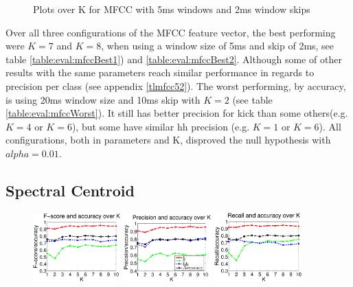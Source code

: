 {\begin{figure}
			\caption{Plots over K for MFCC with 5ms windows and 2ms window skips}
		\end{figure}\clearpage
		
		Over all three configurations of the MFCC feature vector, the best performing were $K=7$ and $K=8$, when using a window size of 5ms and skip of 2ms, see table \ref{table:eval:mfccBest1}) and \ref{table:eval:mfccBest2}. Although some of other results with the same parameters reach similar performance in regards to precision per class (see appendix \ref{tlmfcc52}). The worst performing, by accuracy, is using 20ms window size and 10ms skip with $K=2$ (see table \ref{table:eval:mfccWorst}). It still has better precision for kick than some others(e.g. $K=4$ or $K=6$), but some have similar hh precision (e.g. $K=1$ or $K=6$). All configurations, both in parameters and K, disproved the null hypothesis with $alpha=0.01$.
		
		
	\subsection{Spectral Centroid}
		\begin{figure}
			\centering\includegraphics[width=0.3\textwidth]{tex/appendices/test/scentroid2010FP.png}
			\centering\includegraphics[width=0.3\textwidth]{tex/appendices/test/scentroid2010_P.png}
			\centering\includegraphics[width=0.3\textwidth]{tex/appendices/test/scentroid2010_R.png}
			

\end{figure}}
